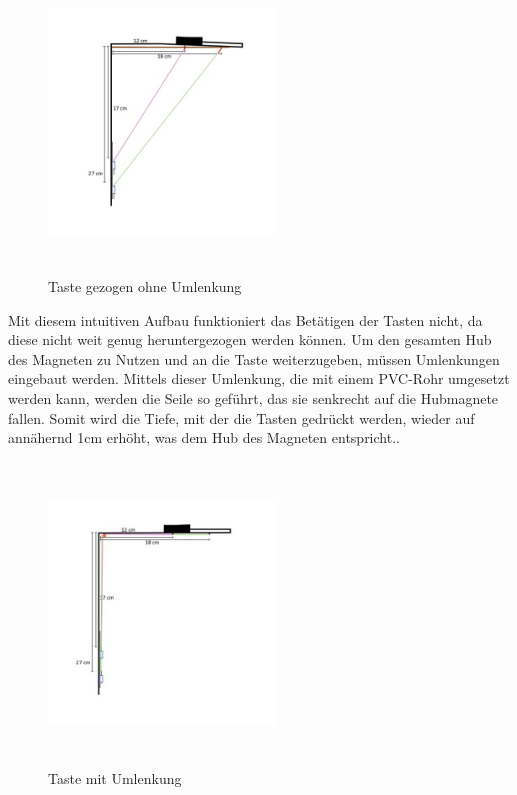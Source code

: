 \begin{figure}[htbp]
    \centering
    \includegraphics[width=6cm, height=8cm]{img/Umlenkung_gezogen}
    \caption{Taste gezogen ohne Umlenkung}
    \label{img:kUmlenkung_gezogen}
\end{figure}

Mit diesem intuitiven Aufbau funktioniert das Betätigen der Tasten nicht, da diese nicht weit genug heruntergezogen werden können.
Um den gesamten Hub des Magneten zu Nutzen und an die Taste weiterzugeben, müssen Umlenkungen eingebaut werden.
Mittels dieser Umlenkung, die mit einem PVC-Rohr umgesetzt werden kann, werden die Seile so geführt, das sie senkrecht auf die Hubmagnete fallen.
Somit wird die Tiefe, mit der die Tasten gedrückt werden, wieder auf annähernd 1cm erhöht, was dem Hub des Magneten entspricht..

\begin{figure}[htbp]
    \centering
    \includegraphics[width=6cm, height=8cm]{img/mitUmlenkung_locker}
    \caption{Taste mit Umlenkung}
    \label{img:mitumlenkung_locker}
\end{figure}


